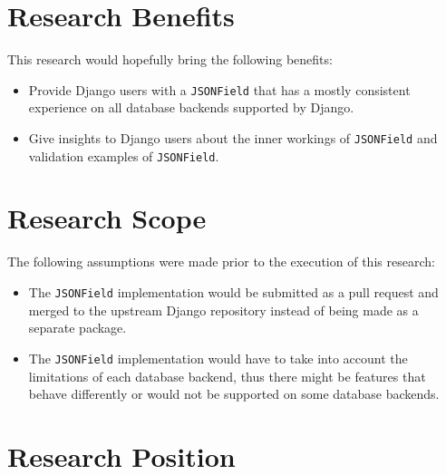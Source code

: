 \section{Research Benefits}

This research would hopefully bring the following benefits:

\begin{itemize}
    \item Provide Django users with a \verb|JSONField| that has a mostly
          consistent experience on all database backends supported by Django.
    \item Give insights to Django users about the inner workings of
          \verb|JSONField| and validation examples of \verb|JSONField|.
\end{itemize}

\section{Research Scope}

The following assumptions were made prior to the execution of this research:

\begin{itemize}
    \item The \verb|JSONField| implementation would be submitted as a pull
          request and merged to the upstream Django repository instead of being
          made as a separate package.
    \item The \verb|JSONField| implementation would have to take into account
          the limitations of each database backend, thus there might be
          features that behave differently or would not be supported on some
          database backends.
\end{itemize}

\section{Research Position}

